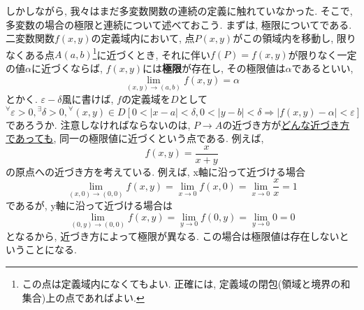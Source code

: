 \documentclass[a4j,dvipdfmx]{jsarticle}
\numberwithin{equation}{section}
\begin{document}
            しかしながら, 我々はまだ多変数関数の連続の定義に触れていなかった. そこで, 多変数の場合の極限と連続について述べておこう.
            まずは, 極限についてである. 二変数関数$f(x,y)$の定義域内において, 点$P(x,y)$がこの領域内を移動し, 限りなくある点$A(a,b)$\footnote{この点は定義域内になくてもよい. 正確には, 定義域の閉包(領域と境界の和集合)上の点であればよい.}に近づくとき, 
            それに伴い$f(P)=f(x,y)$が限りなく一定の値$\alpha$に近づくならば, $f(x,y)$には\textbf{極限}が存在し, その極限値は$\alpha$であるといい,
            \begin{equation}
                \lim_{(x,y)\rightarrow(a,b)}f(x,y)=\alpha \label{eq:偏微分:二変数関数の極限}
            \end{equation}
            とかく. $\varepsilon-\delta$風に書けば, $f$の定義域を$D$として
            \begin{equation}
                {}^\forall \varepsilon>0,{}^\exists \delta>0,{}^\forall(x,y)\in D \left[0<|x-a|<\delta,0<|y-b|<\delta\Rightarrow |f(x,y)-\alpha|<\varepsilon\right] \label{eq:偏微分:二変数関数の極限の定義}
            \end{equation}
            であろうか. 注意しなければならないのは, $P\rightarrow A$の近づき方が\underline{どんな近づき方であっても}, 同一の極限値に近づくという点である.
            例えば, 
            \begin{equation*}
                f(x,y)=\frac{x}{x+y}
            \end{equation*}
            の原点への近づき方を考えている. 例えば, x軸に沿って近づける場合
            \begin{equation*}
                \lim_{(x,0)\rightarrow (0,0)}f(x,y)=\lim_{x\rightarrow 0}f(x,0)=\lim_{x\rightarrow 0}\frac{x}{x}=1
            \end{equation*}
            であるが, y軸に沿って近づける場合は
            \begin{equation*}
                \lim_{(0,y)\rightarrow (0,0)}f(x,y)=\lim_{y\rightarrow 0}f(0,y)=\lim_{y\rightarrow 0}0=0
            \end{equation*}
            となるから, 近づき方によって極限が異なる. この場合は極限値は存在しないということになる.
\end{document}
